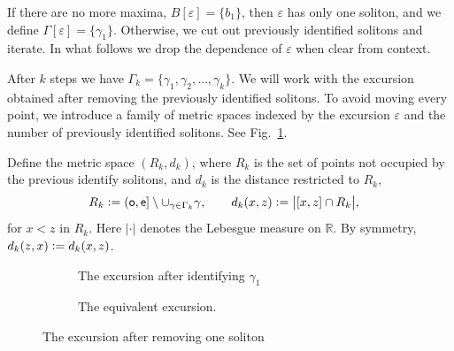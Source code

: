 \documentclass[12pt]{article}
\numberwithin{equation}{section}
\newcommand{\RR}{\mathbb R}
\newcommand{\se}{{\mathsf{e}}}
\newcommand{\so}{{\mathsf{o}}}
\newcommand{\eps}{\varepsilon}
\begin{document}
If there are no more maxima, $B[\eps]=\{b_1\}$,  then $\eps$ has only one soliton, and we define $\Gamma[\eps]=\{\gamma_1\}$.
Otherwise, we cut out previously identified solitons and iterate.
In what follows we drop the dependence of $\eps$ when clear from context.

After $k$ steps we have $\Gamma_k=\{\gamma_1,\gamma_2, \dots,\gamma_k\}$.
We will work with the excursion obtained after removing the previously identified solitons.
To avoid moving every point, we introduce a family of metric spaces indexed by the excursion $\eps$ and the number of previously identified solitons.
See Fig.~\ref{firststep}.

Define the metric space $(R_k, d_k)$, where $R_k$ is the set of points not occupied by the previous identify solitons, and $d_k$ is the distance restricted to $R_k$, 
\begin{align}
 \label{rel1}
 R_k&\vcentcolon =(\so,\se]\setminus \cup_{\gamma\in \Gamma_k}\gamma, \qquad d_k(x, z) \vcentcolon = \bigl|[x, z ]\cap R_k\bigr|, 
\end{align}
for $x<z$ in $R_k$.
Here $|\cdot|$ denotes the Lebesgue measure on $\RR$.
By symmetry, $d_k(z, x)\vcentcolon =d_k(x, z)$.

\begin{figure}[th]
    \centering
    \begin{subfigure}[b]{0.48\textwidth}
        \centering
        \caption{The excursion after identifying $\gamma_1$}
    \end{subfigure}
    \begin{subfigure}[b]{0.48\textwidth}
        \centering
        \caption{The equivalent excursion.}
    \end{subfigure}
    \caption{The excursion after removing one soliton}
    \label{firststep}
\end{figure}
\end{document}
